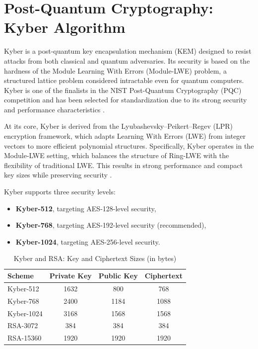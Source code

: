 \section{Post-Quantum Cryptography: Kyber Algorithm}
\label{sec:kyber}

Kyber is a post-quantum key encapsulation mechanism (KEM) designed to resist attacks from both classical and quantum adversaries. Its security is based on the hardness of the Module Learning With Errors (Module-LWE) problem, a structured lattice problem considered intractable even for quantum computers. Kyber is one of the finalists in the NIST Post-Quantum Cryptography (PQC) competition and has been selected for standardization due to its strong security and performance characteristics \cite{kyber2024}.  %

At its core, Kyber is derived from the Lyubashevsky–Peikert–Regev (LPR) encryption framework, which adapts Learning With Errors (LWE) from integer vectors to more efficient polynomial structures. Specifically, Kyber operates in the Module-LWE setting, which balances the structure of Ring-LWE with the flexibility of traditional LWE. This results in strong performance and compact key sizes while preserving security \cite{kyber2024,kyber2021}. %

Kyber supports three security levels:
\begin{itemize}
    \item \textbf{Kyber-512}, targeting AES-128-level security,
    \item \textbf{Kyber-768}, targeting AES-192-level security (recommended),
    \item \textbf{Kyber-1024}, targeting AES-256-level security.
\end{itemize}

\begin{table}[h]
\centering
\caption{Kyber and RSA: Key and Ciphertext Sizes (in bytes)}
\label{tab:kyber_sizes}
\begin{tabular}{|l|c|c|c|}
\hline
\textbf{Scheme} & \textbf{Private Key} & \textbf{Public Key} & \textbf{Ciphertext} \\
\hline
Kyber-512 & 1632 & 800 & 768 \\
Kyber-768 & 2400 & 1184 & 1088 \\
Kyber-1024 & 3168 & 1568 & 1568 \\
RSA-3072 & 384 & 384 & 384 \\
RSA-15360 & 1920 & 1920 & 1920 \\
\hline
\end{tabular}
\end{table}

